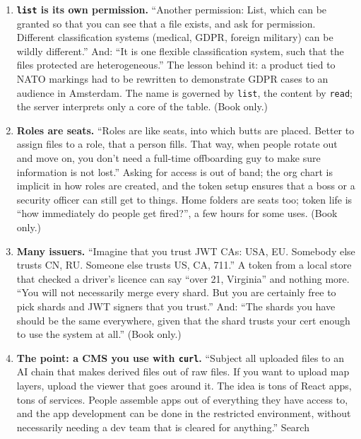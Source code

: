 \begin{enumerate}
  named person of a crime: ``I wonder what is in it?'' A name is governed like
  the content, so no channel may carry a name its reader may not see, and the
  permission over names narrows down the path. (That permission became
  \texttt{list} in the next entry. Book only.)
\item \textbf{\texttt{list} is its own permission.} ``Another permission: List,
  which can be granted so that you can see that a file exists, and ask for
  permission. Different classification systems (medical, GDPR, foreign military)
  can be wildly different.'' And: ``It is one flexible classification system,
  such that the files protected are heterogeneous.'' The lesson behind it: a
  product tied to NATO markings had to be rewritten to demonstrate GDPR cases to
  an audience in Amsterdam. The name is governed by \texttt{list}, the content by
  \texttt{read}; the server interprets only a core of the table. (Book only.)
\item \textbf{Roles are seats.} ``Roles are like seats, into which butts are
  placed. Better to assign files to a role, that a person fills. That way, when
  people rotate out and move on, you don't need a full-time offboarding guy to
  make sure information is not lost.'' Asking for access is out of band; the org
  chart is implicit in how roles are created, and the token setup ensures that a
  boss or a security officer can still get to things. Home folders are seats too;
  token life is ``how immediately do people get fired?'', a few hours for some
  uses. (Book only.)
\item \textbf{Many issuers.} ``Imagine that you trust JWT CAs: USA, EU. Somebody
  else trusts CN, RU. Someone else trusts US, CA, 711.'' A token from a local store
  that checked a driver's licence can say ``over 21, Virginia'' and nothing more.
  ``You will not necessarily merge every shard. But you are certainly free to pick
  shards and JWT signers that you trust.'' And: ``The shards you have should be the
  same everywhere, given that the shard trusts your cert enough to use the system
  at all.'' (Book only.)
\item \textbf{The point: a CMS you use with \texttt{curl}.} ``Subject all uploaded
  files to an AI chain that makes derived files out of raw files. If you want to
  upload map layers, upload the viewer that goes around it. The idea is tons of
  React apps, tons of services. People assemble apps out of everything they have
  access to, and the app development can be done in the restricted environment,
  without necessarily needing a dev team that is cleared for anything.'' Search

\end{enumerate}
